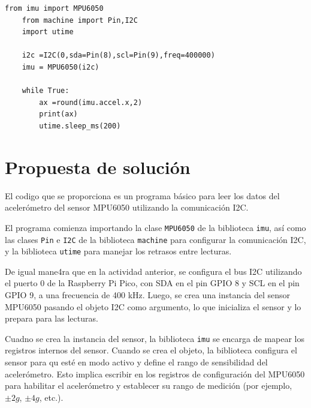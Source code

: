 \documentclass[letterpaper,12pt]{article}
\begin{document}
\begin{center}
{
        }
    \end{center}

    \begin{lstlisting}[basicstyle=\ttfamily\footnotesize,caption={Figura 10-16. Programa de ejemplo; actividad 9}]
    from imu import MPU6050
    from machine import Pin,I2C
    import utime

    i2c =I2C(0,sda=Pin(8),scl=Pin(9),freq=400000)
    imu = MPU6050(i2c)

    while True:
        ax =round(imu.accel.x,2)
        print(ax)
        utime.sleep_ms(200)
    \end{lstlisting}
    \section*{Propuesta de solución}

    El codigo que se proporciona es un programa básico para leer los datos del acelerómetro del sensor MPU6050 utilizando la comunicación I2C. 

    El programa comienza importando la clase \texttt{MPU6050} de la biblioteca \texttt{imu}, así como las clases \texttt{Pin} e \texttt{I2C} de la biblioteca \texttt{machine} para configurar la comunicación I2C, y la biblioteca \texttt{utime} para manejar los retrasos entre lecturas.

    De igual mane4ra que en la actividad anterior, se configura el bus I2C utilizando el puerto 0 de la Raspberry Pi Pico, con SDA en el pin GPIO 8 y SCL en el pin GPIO 9, a una frecuencia de 400 kHz. Luego, se crea una instancia del sensor MPU6050 pasando el objeto I2C como argumento, lo que inicializa el sensor y lo prepara para las lecturas.

    Cuadno se crea la instancia del sensor, la biblioteca \texttt{imu} se encarga de mapear los registros internos del sensor. Cuando se crea el objeto, la biblioteca configura el sensor para qu esté en modo activo y define el rango de sensibilidad del acelerómetro. Esto implica escribir en los registros de configuración del MPU6050 para habilitar el acelerómetro y establecer su rango de medición (por ejemplo, $\pm 2g$, $\pm 4g$, etc.).
\end{document}

